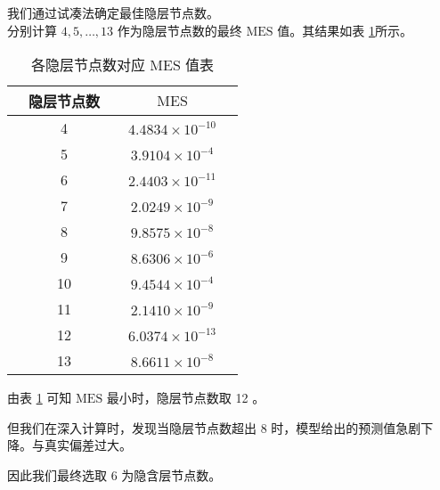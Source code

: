     我们通过试凑法确定最佳隐层节点数。\\
    分别计算 $4,5,\dots,13$ 作为隐层节点数的最终 $\mathrm{MES}$ 值。其结果如表 \ref{tab:yincenjiedian}所示。
    \begin{table}[htb]
      \centering
      \caption{各隐层节点数对应 $\mathrm{MES}$ 值表}
      \begin{tabular*}{0.618\paperwidth}{@{\extracolsep{\fill}}ccccc}
        \toprule[1.5pt]
        &隐层节点数 && $\mathrm{MES}$ &\\
        \midrule[1pt]
        &4 && $4.4834\times 10^{-10}$ &\\
        &5 && $3.9104\times 10^{-4}$ &\\
        &6 && $2.4403\times 10^{-11}$ &\\
        &7 && $2.0249\times 10^{-9}$ &\\
        &8 && $9.8575\times 10^{-8}$ &\\
        &9 && $8.6306\times 10^{-6}$ &\\
        &10 && $9.4544\times 10^{-4}$ &\\
        &11 && $2.1410\times 10^{-9}$ &\\
        &12 && $6.0374\times 10^{-13}$ &\\
        &13 && $8.6611\times 10^{-8}$ &\\
        \bottomrule[1.5pt]
      \end{tabular*}
      \label{tab:yincenjiedian}
    \end{table}
    \clearpage

    由表 \ref{tab:yincenjiedian} 可知 $\mathrm{MES}$ 最小时，隐层节点数取 12 。

    但我们在深入计算时，发现当隐层节点数超出 8 时，模型给出的预测值急剧下降。与真实偏差过大。%

    因此我们最终选取 6 为隐含层节点数。